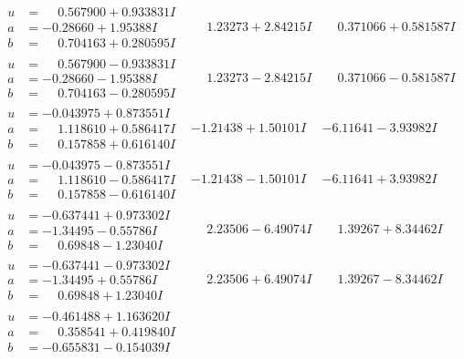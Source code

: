 \documentclass[1p]{elsarticle_modified}
\theoremstyle{definition}
\begin{document}
$$\begin{array}{c|c|c}
\begin{aligned}
u &= \phantom{-}0.567900 + 0.933831 I \\
a &= -0.28660 + 1.95388 I \\
b &= \phantom{-}0.704163 + 0.280595 I\end{aligned}
 & \phantom{-}1.23273 + 2.84215 I & \phantom{-}0.371066 + 0.581587 I \\ \hline\begin{aligned}
u &= \phantom{-}0.567900 - 0.933831 I \\
a &= -0.28660 - 1.95388 I \\
b &= \phantom{-}0.704163 - 0.280595 I\end{aligned}
 & \phantom{-}1.23273 - 2.84215 I & \phantom{-}0.371066 - 0.581587 I \\ \hline\begin{aligned}
u &= -0.043975 + 0.873551 I \\
a &= \phantom{-}1.118610 + 0.586417 I \\
b &= \phantom{-}0.157858 + 0.616140 I\end{aligned}
 & -1.21438 + 1.50101 I & -6.11641 - 3.93982 I \\ \hline\begin{aligned}
u &= -0.043975 - 0.873551 I \\
a &= \phantom{-}1.118610 - 0.586417 I \\
b &= \phantom{-}0.157858 - 0.616140 I\end{aligned}
 & -1.21438 - 1.50101 I & -6.11641 + 3.93982 I \\ \hline\begin{aligned}
u &= -0.637441 + 0.973302 I \\
a &= -1.34495 - 0.55786 I \\
b &= \phantom{-}0.69848 - 1.23040 I\end{aligned}
 & \phantom{-}2.23506 - 6.49074 I & \phantom{-}1.39267 + 8.34462 I \\ \hline\begin{aligned}
u &= -0.637441 - 0.973302 I \\
a &= -1.34495 + 0.55786 I \\
b &= \phantom{-}0.69848 + 1.23040 I\end{aligned}
 & \phantom{-}2.23506 + 6.49074 I & \phantom{-}1.39267 - 8.34462 I \\ \hline\begin{aligned}
u &= -0.461488 + 1.163620 I \\
a &= \phantom{-}0.358541 + 0.419840 I \\
b &= -0.655831 - 0.154039 I\end{aligned}

\end{array}$$
\end{document}
